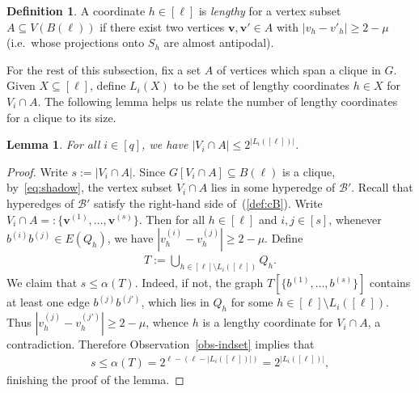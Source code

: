 \documentclass[10pt,a4paper]{article}
\newcommand{\V}[1]{\mathbold{#1}}
\newtheorem{lemma}[theorem]{Lemma}
\theoremstyle{definition}
\newtheorem{definition}[theorem]{Definition}
\newcommand{\cB}{\mathcal{B}}
\begin{document}
\begin{definition}
	A coordinate $h\in[\ell]$  is \emph{lengthy} for a vertex subset $A\subseteq V(B(\ell))$ if there exist two vertices $\V{v},\V{v'}\in A$ with $|v_h - v'_h|\ge 2-\mu$ (i.e.~whose projections onto $S_h$ are almost antipodal).
\end{definition}

For the rest of this subsection, fix a set $A$ of vertices which span a clique in $G$. Given $X \subseteq [\ell]$, define $L_i(X)$ to be the set of lengthy coordinates $h \in X$ for $V_i \cap A$. The following lemma helps us relate the number of lengthy coordinates for a clique to its size.




\begin{lemma}\label{lem-cliquesize}
	For all  $i\in [q]$, we have $|V_{i}\cap A|\le 2^{|L_i([\ell])|}$.
\end{lemma}
\begin{proof}
	Write $s := |V_i \cap A|$.
	Since $G[V_i\cap A]\subseteq B(\ell)$ is a clique, by~\eqref{eq:shadow}, the vertex subset $V_i\cap A$ lies in some hyperedge of $\cB'$. Recall that hyperedges of $\cB'$ satisfy the right-hand side of~(\ref{def:cB}). Write $V_i\cap A =: \{\V{v}^{(1)},\ldots,\V{v}^{(s)}\}$. Then for all $h \in [\ell]$ and $i,j \in [s]$, whenever $b^{(i)}b^{(j)} \in E(Q_h)$, we have $|v_h^{(i)}-v_h^{(j)}| \geq 2-\mu$.
	Define
	\begin{align*}
	T := \bigcup_{h\in [\ell]\setminus L_i([\ell])}Q_{h}.
	\end{align*}
	We claim that
	$s\le \alpha(T)$.
	Indeed, if not, the graph $T[\{b^{(1)},\ldots, b^{(s)}\}]$ contains at least one edge $b^{(j)}b^{(j')}$, which lies in $Q_h$ for some $h\in [\ell]\setminus L_i([\ell])$. Thus $|v_{h}^{(j)} - v_{h}^{(j')}|\ge 2-\mu$, whence $h$ is a lengthy coordinate for $V_i\cap A$, a contradiction.	
	Therefore Observation~\ref{obs-indset} implies that
	\begin{align*}
	s\le \alpha\left(T\right)= 2^{\ell-(\ell-|L_i([\ell])|)}=2^{|L_i([\ell])|},
	\end{align*}
	finishing the proof of the lemma.
\end{proof}

\end{document}
